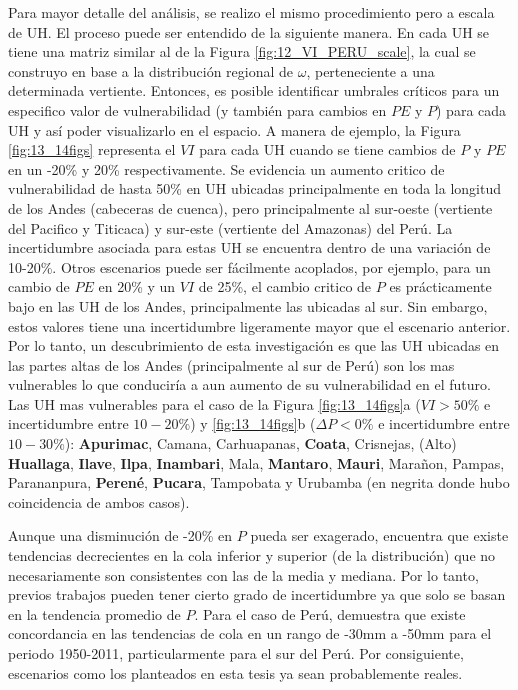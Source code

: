 \documentclass[12pt]{article}
\begin{document}
Para mayor detalle del análisis, se realizo el mismo procedimiento pero a escala de UH. El proceso puede ser entendido de la siguiente manera. En cada UH se tiene una matriz similar al de la Figura \ref{fig:12_VI_PERU_scale}, la cual se construyo en base a la distribución regional de $\omega$, perteneciente a una determinada vertiente. Entonces, es posible identificar umbrales críticos para un especifico valor de vulnerabilidad (y también para cambios en $PE$ y $P$) para cada UH y así poder visualizarlo en el espacio. A manera de ejemplo, la Figura \ref{fig:13_14figs} representa el $VI$ para cada UH cuando se tiene cambios de $P$ y $PE$ en un -20\% y 20\% respectivamente. Se evidencia un aumento critico de vulnerabilidad de hasta 50\% en UH ubicadas principalmente en toda la longitud de los Andes (cabeceras de cuenca), pero principalmente al sur-oeste (vertiente del Pacifico y Titicaca) y sur-este (vertiente del Amazonas) del Perú. La incertidumbre asociada para estas UH se encuentra dentro de una variación de 10-20\%. Otros escenarios puede ser fácilmente acoplados, por ejemplo, para un cambio de $PE$ en 20\% y un $VI$ de 25\%, el cambio critico de $P$ es prácticamente bajo en las UH de los Andes, principalmente las ubicadas al sur. Sin embargo, estos valores tiene una incertidumbre ligeramente mayor que el escenario anterior. Por lo tanto, un descubrimiento de esta investigación es que las UH ubicadas en las partes altas de los Andes (principalmente al sur de Perú) son los mas vulnerables lo que conduciría a aun aumento de su vulnerabilidad en el futuro. Las UH mas vulnerables para el caso de la Figura \ref{fig:13_14figs}a ($VI > 50\%$ e incertidumbre entre $10-20\%$) y \ref{fig:13_14figs}b ($\Delta P < 0\%$ e incertidumbre entre $10-30\%$): \textbf{Apurimac}, Camana, Carhuapanas, \textbf{Coata}, Crisnejas, (Alto) \textbf{Huallaga}, \textbf{Ilave}, \textbf{Ilpa}, \textbf{Inambari}, Mala, \textbf{Mantaro}, \textbf{Mauri}, Marañon, Pampas, Parananpura, \textbf{Perené}, \textbf{Pucara}, Tampobata y Urubamba (en negrita donde hubo coincidencia de ambos casos).

Aunque una disminución de -20\% en $P$ pueda ser exagerado, \citet{lausier2018overlooked} encuentra que existe tendencias decrecientes en la cola inferior y superior (de la distribución) que no necesariamente son consistentes con las de la media y mediana. Por lo tanto, previos trabajos pueden tener cierto grado de incertidumbre ya que solo se basan en la tendencia promedio de $P$. Para el caso de Perú, \citet{lausier2018overlooked} demuestra que existe concordancia en las tendencias de cola en un rango de -30mm a -50mm para el periodo 1950-2011, particularmente para el sur del Perú. Por consiguiente, escenarios como los planteados en esta tesis ya sean probablemente reales.
\end{document}
